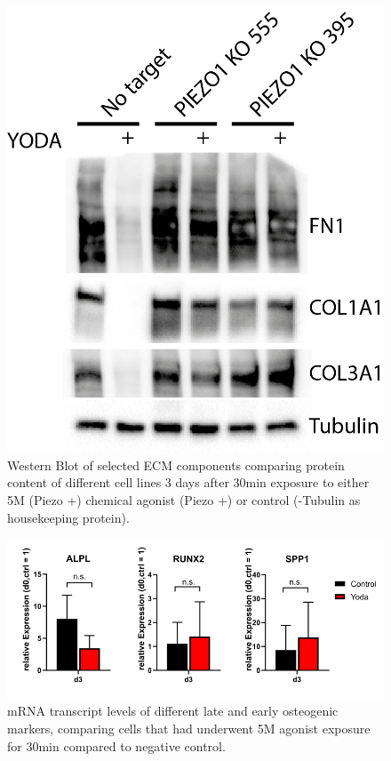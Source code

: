 \begin{figure}
	\centering
	\includegraphics[width=0.7\linewidth]{Uli_Blot_KO.png}
	\caption{Western Blot of selected ECM components comparing protein content of different cell lines 3 days after 30min exposure to either 5\textmu{}M (Piezo +) chemical \Piezo{} agonist (Piezo +) or control  (\textalpha{}-Tubulin as housekeeping protein).}
	\label{pic:UliBlot}
\end{figure}


\begin{figure}[htbp]
\centering
\includegraphics[width = \linewidth]{Osteogenic_PCR_Yoda.png}
\caption{mRNA transcript levels of different late and early osteogenic markers, comparing cells that had underwent 5\textmu{}M \Piezo{} agonist exposure for 30min compared to negative control.}
\end{figure}

